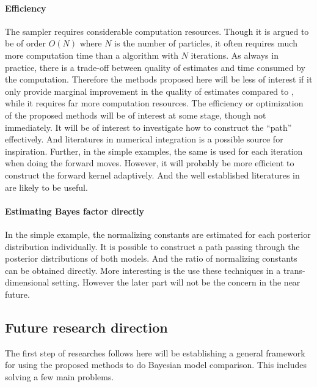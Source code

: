 \paragraph{Efficiency} The \smc sampler requires considerable computation
resources. Though it is argued to be of order $O(N)$ where $N$ is the number
of particles, it often requires much more computation time than a \mcmc
algorithm with $N$ iterations. As always in practice, there is a trade-off
between quality of estimates and time consumed by the computation. Therefore
the methods proposed here will be less of interest if it only provide marginal
improvement in the quality of estimates compared to \mcmc, while it requires
far more computation resources. The efficiency or optimization of the proposed
methods will be of interest at some stage, though not immediately. It will be
of interest to investigate how to construct the ``path'' effectively. And
literatures in numerical integration is a possible source for inspiration.
Further, in the simple examples, the same \mha is used for each iteration when
doing the forward moves. However, it will probably be more efficient to
construct the forward kernel adaptively. And the well established literatures
in \mcmc are likely to be useful.

\paragraph{Estimating Bayes factor directly} In the simple example, the
normalizing constants are estimated for each posterior distribution
individually. It is possible to construct a path passing through the posterior
distributions of both models. And the ratio of normalizing constants can be
obtained directly. More interesting is the use these techniques in a
trans-dimensional setting. However the later part will not be the concern in
the near future.

\subsection{Future research direction}
\label{sub:Future research direction}

The first step of researches follows here will be establishing a general
framework for using the proposed methods to do Bayesian model comparison. This
includes solving a few main problems.

